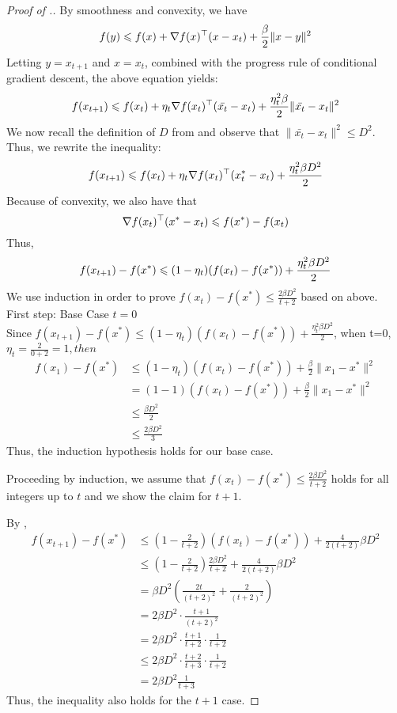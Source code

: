 \begin{proof}[Proof of .]
By smoothness and convexity, we have
$$ f(y) \leqslant f(x) +\nabla f(x) ^\top (x-x_t) + \frac{\beta}{2} \| x-y \| ^2 $$
Letting $ y = x_{t+1} $ and $x= x_t$, combined with the progress rule of conditional gradient descent, the above equation yields:
$$ f(x_{t+1}) \leqslant f(x_t) + \eta_t \nabla f(x_t) ^\top (\bar{x_t} - x_t) + \frac{\eta_t^2\beta}{2} \| \bar{x_t} - x_t \| ^2 $$
We now recall the definition of $D$ from  and observe that $\| \bar{x_t} - x_t \| ^2 \leq D^2$. Thus, we rewrite the inequality:
$$ f(x_{t+1}) \leqslant f(x_t) + \eta_t \nabla f(x_t) ^\top (x_t^* - x_t) + \frac{\eta_t^2\beta D ^2}{2} $$
Because of convexity, we also have that
$$ \nabla f(x_t) ^\top (x^*-x_t) \leqslant f(x^*) - f(x_t) $$
Thus,
\begin{equation}\equationlabel{convergenceInequal}
f(x_{t+1})-f(x^*) \leq (1-\eta_t)(f(x_t)-f(x^*)) + \frac{\eta_t^2\beta D ^2}{2}
\end{equation}
We use induction in order to prove $f(x_t)-f(x^*) \leq \frac{2\beta D^2}{t+2}$  based on  above.\\
First step: Base Case $t=0$ \\
Since $ f(x_{t+1})-f(x^*) \leq (1-\eta_t)(f(x_t)-f(x^*)) + \frac{\eta_t^2\beta D ^2}{2}$, when t=0, $\eta_t =\frac{2}{0+2}=1, then $
\begin{align*} f(x_1)-f(x^*) &\leq (1-\eta_t)(f(x_t)-f(x^*)) + \frac{\beta}{2}\| x_1-x^* \|^2 \\
&= (1-1)(f(x_t)-f(x^*)) + \frac{\beta}{2}\| x_1-x^* \|^2 \\
&\leq \frac{\beta D^2}{2}\\
&\leq \frac{2\beta D^2}{3}
\end{align*}
Thus, the induction hypothesis holds for our base case.

Proceeding by induction,
we assume that $f(x_t)-f(x^*) \leq \frac{2\beta D^2}{t+2}$ holds for all
integers up to $t$ and we show the claim for $t+1.$

By ,
\begin{align*} f(x_{t+1})-f(x^*) &\leq \left(1- \frac{2}{t+2}\right) (f(x_t)-f(x^*))+ \frac{4}{2(t+2)} \beta D^2 \\
& \leq \left(1- \frac{2}{t+2}\right)\frac{2\beta D^2}{t+2}
+ \frac{4}{2(t+2)} \beta D^2 \\
& = \beta D^2 \left(\frac{2t}{(t+2)^2}+\frac{2}{(t+2)^2}\right) \\
& = 2\beta D^2 \cdot\frac{t+1}{(t+2)^2} \\
& = 2\beta D^2 \cdot\frac{t+1}{t+2}\cdot\frac{1}{t+2} \\
& \leq 2\beta D^2 \cdot\frac{t+2}{t+3}\cdot\frac{1}{t+2} \\
& = 2\beta D^2 \frac{1}{t+3}
\end{align*}
Thus, the inequality also holds for the $t+1$ case.

\end{proof}

